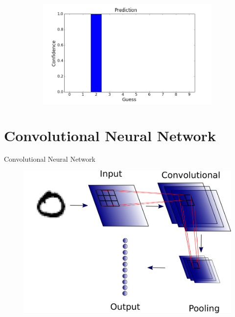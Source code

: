 \begin{frame}[plain]
\begin{figure}
\begin{subfigure}{0.2\textwidth}
\end{subfigure}
\\\vspace{-1cm}
\begin{subfigure}{0.8\textwidth}
\includegraphics[width=\textwidth]{mlp_prediction}

\end{subfigure}
\end{figure}
\end{frame}


\section{Convolutional Neural Network}


\begin{frame}[plain]{Convolutional Neural Network}
\begin{figure}
\includegraphics[width = 0.8 \textwidth]{"cnn"}
\end{figure}
\end{frame}

